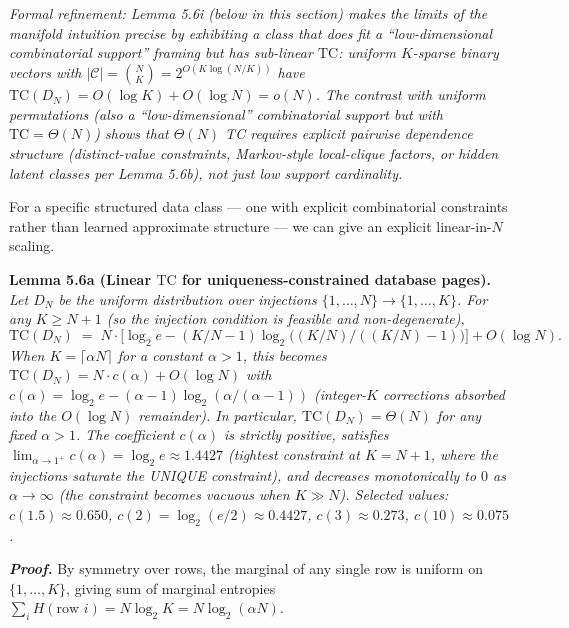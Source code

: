 \documentclass[
]{article}
\begin{document}
\emph{Formal refinement: Lemma 5.6i (below in this section) makes
the limits of the manifold intuition precise by exhibiting a class
that does fit a ``low-dimensional combinatorial support'' framing
but has \emph{sub-linear} $\mathrm{TC}$: uniform $K$-sparse binary
vectors with $|\mathcal{C}| = \binom{N}{K} = 2^{O(K \log(N/K))}$
have $\mathrm{TC}(D_N) = O(\log K) + O(\log N) = o(N)$. The
contrast with uniform permutations (also a ``low-dimensional''
combinatorial support but with $\mathrm{TC} = \Theta(N)$) shows
that $\Theta(N)$ TC requires explicit pairwise dependence structure
(distinct-value constraints, Markov-style local-clique factors, or
hidden latent classes per Lemma 5.6b), not just low support
cardinality.}

For a specific structured data class --- one with explicit
combinatorial constraints rather than learned approximate
structure --- we can give an explicit linear-in-$N$ scaling.

\textbf{Lemma 5.6a (Linear $\mathrm{TC}$ for uniqueness-constrained
database pages).} \emph{Let $D_N$ be the uniform distribution over
injections $\{1, \dots, N\} \to \{1, \dots, K\}$. For any $K \geq
N+1$ (so the injection condition is feasible and non-degenerate),}
\[
\mathrm{TC}(D_N) \;=\; N \cdot \bigl[\log_2 e - (K/N - 1) \log_2\bigl((K/N)/((K/N)-1)\bigr)\bigr] + O(\log N).
\tag{5.5}
\]
\emph{When $K = \lceil \alpha N \rceil$ for a constant $\alpha > 1$,
this becomes $\mathrm{TC}(D_N) = N \cdot c(\alpha) + O(\log N)$ with
$c(\alpha) = \log_2 e - (\alpha-1) \log_2(\alpha/(\alpha-1))$
(integer-$K$ corrections absorbed into the $O(\log N)$ remainder).
In particular, $\mathrm{TC}(D_N) = \Theta(N)$ for any fixed
$\alpha > 1$. The coefficient $c(\alpha)$ is strictly positive,
satisfies $\lim_{\alpha \to 1^+} c(\alpha) = \log_2 e \approx
1.4427$ (tightest constraint at $K = N+1$, where the injections
saturate the UNIQUE constraint), and decreases monotonically to
$0$ as $\alpha \to \infty$ (the constraint becomes vacuous when
$K \gg N$). Selected values: $c(1.5) \approx 0.650$,
$c(2) = \log_2(e/2) \approx 0.4427$, $c(3) \approx 0.273$,
$c(10) \approx 0.075$.}

\emph{\textbf{Proof.}} By symmetry over rows, the marginal of any
single row is uniform on $\{1, \dots, K\}$, giving sum of marginal
entropies
$\sum_i H(\text{row } i) = N \log_2 K = N \log_2(\alpha N)$.
\end{document}
